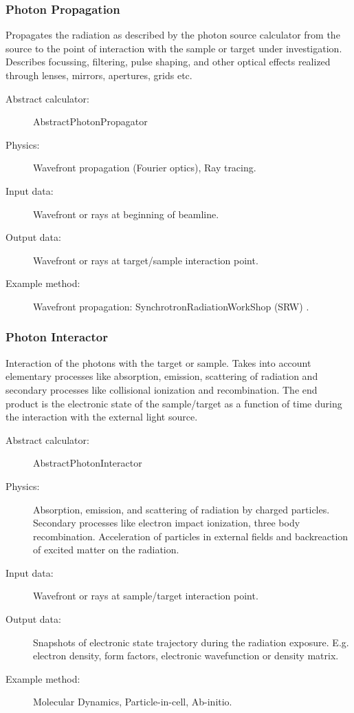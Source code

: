 \documentclass[a4paper]{article}
\begin{document}
\subsubsection{Photon Propagation}
Propagates the radiation as described by the photon source calculator from the source to the point of interaction with the sample or target under
    investigation. Describes focussing, filtering, pulse shaping,
    and other optical effects realized through lenses, mirrors, apertures, grids etc.
\begin{description}
  \item[Abstract calculator:] AbstractPhotonPropagator
  \item[Physics:] Wavefront propagation (Fourier optics), Ray tracing.
  \item[Input data:] Wavefront or rays at beginning of beamline.
  \item[Output data:] Wavefront or rays at target/sample interaction point.
  \item[Example method:] Wavefront propagation: SynchrotronRadiationWorkShop (SRW) \cite{}.
\end{description}

\subsubsection{Photon Interactor}
Interaction of the photons with the target or sample. Takes into account elementary processes like absorption, emission, scattering of radiation and secondary processes like collisional ionization and recombination. The end product is the electronic state of the sample/target as a function of time during the interaction with the external light source.
\begin{description}
  \item[Abstract calculator:] AbstractPhotonInteractor
  \item[Physics:] Absorption, emission, and scattering of radiation by charged particles. Secondary processes like electron impact ionization, three
    body recombination. Acceleration of particles in external fields and backreaction of excited matter on the radiation.
  \item[Input data:] Wavefront or rays at sample/target interaction point.
  \item[Output data:] Snapshots of electronic state trajectory during the radiation exposure. E.g. electron density, form factors, electronic
    wavefunction or density matrix.
  \item[Example method:] Molecular Dynamics, Particle-in-cell, Ab-initio.
\end{description}
\end{document}
